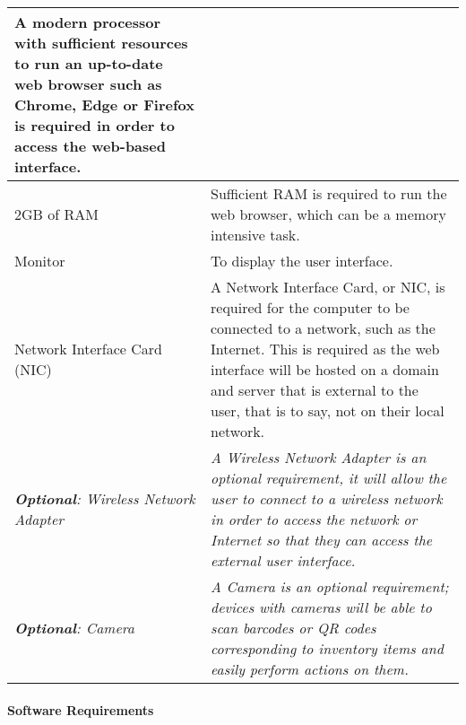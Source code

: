 \documentclass[../../../main.tex]{subfiles}
\begin{document}
\begin{tabular}{ |p{}|p{}| }
    A modern processor with sufficient resources to run an up-to-date web browser such as Chrome, Edge or Firefox is required in order to access the web-based interface.                                                                                                                                                           \\
    \hline
    2GB of RAM                                           & Sufficient RAM is required to run the web browser, which can be a memory intensive task.                                                                                                                                                                                 \\
    \hline
    Monitor                                              & To display the user interface.                                                                                                                                                                                                                                           \\
    \hline
    Network Interface Card (NIC)                         & A Network Interface Card, or NIC, is required for the computer to be connected to a network, such as the Internet. This is required as the web interface will be hosted on a domain and server that is external to the user, that is to say, not on their local network. \\
    \hline
    \textit{\textbf{Optional}: Wireless Network Adapter} & \textit{A Wireless Network Adapter is an optional requirement, it will allow the user to connect to a wireless network in order to access the network or Internet so that they can access the external user interface.}                                                  \\
    \hline
    \textit{\textbf{Optional}: Camera}                   & \textit{A Camera is an optional requirement; devices with cameras will be able to scan barcodes or QR codes corresponding to inventory items and easily perform actions on them.}                                                                                        \\
    \hline
\end{tabular}

\paragraph{Software Requirements\\\\}
\end{document}
